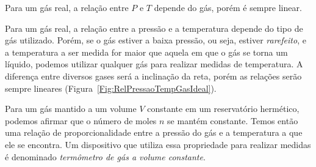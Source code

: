 \begin{marginfigure}
\centering
{}
\caption{Para um gás real, a relação entre $P$ e $T$ depende do gás, porém é sempre linear.\label{Fig:RelPressaoTempGasIdeal}}
\end{marginfigure}

Para um gás real, a relação entre a pressão e a temperatura depende do tipo de gás utilizado. Porém, se o gás estiver a baixa pressão, ou seja, estiver \emph{rarefeito}, e a temperatura a ser medida for maior que aquela em que o gás se torna um líquido, podemos utilizar qualquer gás para realizar medidas de temperatura. A diferença entre diversos gases será a inclinação da reta, porém as relações serão sempre lineares (Figura~\ref{Fig:RelPressaoTempGasIdeal}).

Para um gás mantido a um volume $V$ constante em um reservatório hermético, podemos afirmar que o número de moles $n$ se mantém constante. Temos então uma relação de proporcionalidade entre a pressão do gás e a temperatura a que ele se encontra. Um dispositivo que utiliza essa propriedade para realizar medidas é denominado \emph{termômetro de gás a volume constante}.

